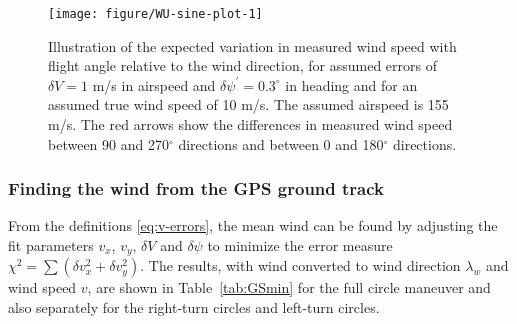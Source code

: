 \documentclass[12pt,twoside,english]{article}\usepackage[]{graphicx}\usepackage[]{color}
\newenvironment{knitrout}{}{} %
\begin{document}
\begin{knitrout}\footnotesize
{}\color{fgcolor}\begin{figure}

{\centering \texttt{[image: figure/WU-sine-plot-1]} 

}

\caption[Illustration of the expected variation in measured wind speed with flight angle relative to the wind direction, for assumed errors in airspeed and heading.]{Illustration of the expected variation in measured wind speed with flight angle relative to the wind direction, for assumed errors of $\delta V=1$ m/s in airspeed and $\delta\psi^{\prime}=0.3^{\circ}$ in heading and for an assumed true wind speed of 10 m/s. The assumed airspeed is 155 m/s. The red arrows show the differences in measured wind speed between 90 and 270$^{\circ}$ directions and between 0 and 180$^{\circ}$ directions.}\label{fig:sine-plot}
\end{figure}


\end{knitrout}



\subsubsection{Finding the wind from the GPS ground track}

From the definitions \eqref{eq:v-errors}, the mean wind can be found by adjusting the fit parameters $v_{x}$, $v_{y}$, $\delta V$ and $\delta\psi$ to minimize the error measure $\chi^{2}=\sum(\delta v_{x}^{2}+\delta v_{y}^{2})$. The results, with wind converted to wind direction $\lambda_w$ and wind speed $v$, are shown in Table~\ref{tab:GSmin} for the full circle maneuver and also separately for the right-turn circles and left-turn circles. 
\end{document}
